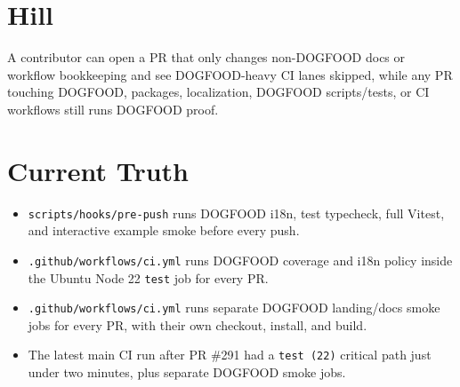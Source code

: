 \section{Hill}\label{record-211-hill}

A contributor can open a PR that only changes non-DOGFOOD docs or workflow bookkeeping and see DOGFOOD-heavy CI lanes skipped, while any PR touching DOGFOOD, packages, localization, DOGFOOD scripts/tests, or CI workflows still runs DOGFOOD proof.

\section{Current Truth}\label{record-211-current-truth}

\begin{itemize}
\tightlist
\item
  \texttt{s\allowbreak{}c\allowbreak{}r\allowbreak{}i\allowbreak{}p\allowbreak{}t\allowbreak{}s\allowbreak{}/\allowbreak{}h\allowbreak{}o\allowbreak{}o\allowbreak{}k\allowbreak{}s\allowbreak{}/\allowbreak{}p\allowbreak{}r\allowbreak{}e\allowbreak{}-\allowbreak{}p\allowbreak{}u\allowbreak{}s\allowbreak{}h} runs DOGFOOD i18n, test typecheck, full Vitest, and interactive example smoke before every push.
\item
  \texttt{.\allowbreak{}g\allowbreak{}i\allowbreak{}t\allowbreak{}h\allowbreak{}u\allowbreak{}b\allowbreak{}/\allowbreak{}w\allowbreak{}o\allowbreak{}r\allowbreak{}k\allowbreak{}f\allowbreak{}l\allowbreak{}o\allowbreak{}w\allowbreak{}s\allowbreak{}/\allowbreak{}c\allowbreak{}i\allowbreak{}.\allowbreak{}y\allowbreak{}m\allowbreak{}l} runs DOGFOOD coverage and i18n policy inside the Ubuntu Node 22 \texttt{t\allowbreak{}e\allowbreak{}s\allowbreak{}t} job for every PR.
\item
  \texttt{.\allowbreak{}g\allowbreak{}i\allowbreak{}t\allowbreak{}h\allowbreak{}u\allowbreak{}b\allowbreak{}/\allowbreak{}w\allowbreak{}o\allowbreak{}r\allowbreak{}k\allowbreak{}f\allowbreak{}l\allowbreak{}o\allowbreak{}w\allowbreak{}s\allowbreak{}/\allowbreak{}c\allowbreak{}i\allowbreak{}.\allowbreak{}y\allowbreak{}m\allowbreak{}l} runs separate DOGFOOD landing/docs smoke jobs for every PR, with their own checkout, install, and build.
\item
  The latest main CI run after PR \#291 had a \texttt{t\allowbreak{}e\allowbreak{}s\allowbreak{}t\allowbreak{} \allowbreak{}(\allowbreak{}2\allowbreak{}2\allowbreak{})} critical path just under two minutes, plus separate DOGFOOD smoke jobs.
\end{itemize}

